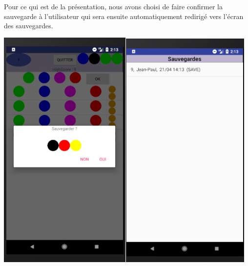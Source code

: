 \documentclass{article}
\begin{document}
Pour ce qui est de la présentation, nous avons choisi de faire confirmer la sauvegarde à l'utilisateur qui sera ensuite automatiquement redirigé vers l'écran des sauvegardes.
\begin{center}
\includegraphics[scale = 0.5]{Popup_save}\includegraphics[scale = 0.5]{Saves}
\end{center}
\end{document}
